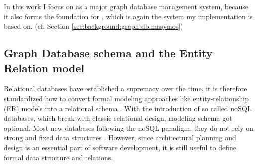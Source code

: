 In this work I focus on \neoj as a major graph database management system, because it also forms the foundation for \masymos \citep{Henkel2015}, which is again the system my implementation is based on. (cf. Section \ref{sec:background:graph-db:masymos})

\subsection{Graph Database schema and the Entity Relation model}
\label{sec:background:graph-db:er}
Relational databases have established a supremacy over the time, it is therefore standardized how to convert formal modeling approaches like entity-relationship (ER) models into a relational schema \citep{Saake2010}. With the introduction of so called noSQL databases, which break with classic relational design, modeling schema got optional. Most new databases following the noSQL paradigm, they do not rely on strong and fixed data structures \citep{Tudorica2011}.
However, since architectural planning and design is an essential part of software development, it is still useful to define formal data structure and relations.

